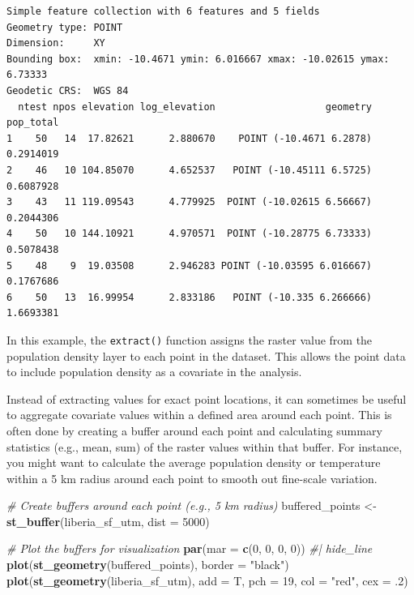 \documentclass[
  letterpaper,
]{krantz}
\newenvironment{Shaded}{\begin{snugshade}}{\end{snugshade}}
\newcommand{\AttributeTok}[1]{\textcolor[rgb]{0.13,0.29,0.53}{#1}}
\newcommand{\CommentTok}[1]{\textcolor[rgb]{0.56,0.35,0.01}{\textit{#1}}}
\newcommand{\DecValTok}[1]{\textcolor[rgb]{0.00,0.00,0.81}{#1}}
\newcommand{\FunctionTok}[1]{\textcolor[rgb]{0.13,0.29,0.53}{\textbf{#1}}}
\newcommand{\NormalTok}[1]{#1}
\newcommand{\OtherTok}[1]{\textcolor[rgb]{0.56,0.35,0.01}{#1}}
\newcommand{\StringTok}[1]{\textcolor[rgb]{0.31,0.60,0.02}{#1}}
\begin{document}
\begin{verbatim}
Simple feature collection with 6 features and 5 fields
Geometry type: POINT
Dimension:     XY
Bounding box:  xmin: -10.4671 ymin: 6.016667 xmax: -10.02615 ymax: 6.73333
Geodetic CRS:  WGS 84
  ntest npos elevation log_elevation                   geometry pop_total
1    50   14  17.82621      2.880670    POINT (-10.4671 6.2878) 0.2914019
2    46   10 104.85070      4.652537   POINT (-10.45111 6.5725) 0.6087928
3    43   11 119.09543      4.779925  POINT (-10.02615 6.56667) 0.2044306
4    50   10 144.10921      4.970571  POINT (-10.28775 6.73333) 0.5078438
5    48    9  19.03508      2.946283 POINT (-10.03595 6.016667) 0.1767686
6    50   13  16.99954      2.833186   POINT (-10.335 6.266666) 1.6693381
\end{verbatim}

In this example, the \texttt{extract()} function assigns the raster
value from the population density layer to each point in the dataset.
This allows the point data to include population density as a covariate
in the analysis.

Instead of extracting values for exact point locations, it can sometimes
be useful to aggregate covariate values within a defined area around
each point. This is often done by creating a buffer around each point
and calculating summary statistics (e.g., mean, sum) of the raster
values within that buffer. For instance, you might want to calculate the
average population density or temperature within a 5 km radius around
each point to smooth out fine-scale variation.

\begin{Shaded}
\begin{Highlighting}[]
\CommentTok{\# Create buffers around each point (e.g., 5 km radius)}
\NormalTok{buffered\_points }\OtherTok{\textless{}{-}} \FunctionTok{st\_buffer}\NormalTok{(liberia\_sf\_utm, }\AttributeTok{dist =} \DecValTok{5000}\NormalTok{)  }

\CommentTok{\# Plot the buffers for visualization}
\FunctionTok{par}\NormalTok{(}\AttributeTok{mar =} \FunctionTok{c}\NormalTok{(}\DecValTok{0}\NormalTok{, }\DecValTok{0}\NormalTok{, }\DecValTok{0}\NormalTok{, }\DecValTok{0}\NormalTok{))  }\CommentTok{\#| hide\_line}
\FunctionTok{plot}\NormalTok{(}\FunctionTok{st\_geometry}\NormalTok{(buffered\_points), }\AttributeTok{border =} \StringTok{"black"}\NormalTok{)}
\FunctionTok{plot}\NormalTok{(}\FunctionTok{st\_geometry}\NormalTok{(liberia\_sf\_utm), }\AttributeTok{add =}\NormalTok{ T, }\AttributeTok{pch =} \DecValTok{19}\NormalTok{, }\AttributeTok{col =} \StringTok{"red"}\NormalTok{, }\AttributeTok{cex =}\NormalTok{ .}\DecValTok{2}\NormalTok{)}
\end{Highlighting}
\end{Shaded}
\end{document}
